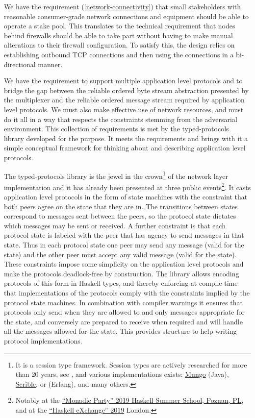 \documentclass[11pt,a4paper]{article}
\begin{document}
We have the requirement
(\cref{network-connectivity}) that small
stakeholders with reasonable consumer-grade network connections and
equipment should be able to operate a stake pool. This translates to the
technical requirement that nodes behind firewalls should be able to take
part without having to make manual alterations to their firewall
configuration. To satisfy this, the design relies on establishing
outbound TCP connections and then using the connections in a
bi-directional manner.

We have the requirement to support multiple application level protocols
and to bridge the gap between the reliable ordered byte stream
abstraction presented by the multiplexer and the reliable ordered
message stream required by application level protocols. We must also
make effective use of network resources, and must do it all in a way
that respects the constraints stemming from the adversarial environment.
This collection of requirements is met by the typed-protocols library
developed for the purpose. It meets the requirements and brings with it
a simple conceptual framework for thinking about and describing
application level protocols.

The typed-protocols library is the jewel in the crown\footnote{It is a
  session type framework. Session types are actively researched for more
  than 20 years, see \cite{H93, THK94, HVK98}, and various
  implementations exists:
  \href{http://www.dcs.gla.ac.uk/research/mungo/}{{Mungo}} (Java),
  \href{http://www.scrible.org}{{Scrible}}, or \cite{MV11} (Erlang), and
  many others.} of the network layer implementation and it has already
been presented at three public events\footnote{Notably at the
  \href{https://monadic.party/\#talks}{``Monadic Party'' 2019 Haskell
  Summer School, Poznan, PL}, and at the
  \href{https://skillsmatter.com/conferences/11741-haskell-exchange-2019\#program}{{``Haskell
  eXchange'' 2019}} London.}. It casts application level protocols in
the form of state machines with the constraint that both peers agree on
the state that they are in. The transitions between states correspond to
messages sent between the peers, so the protocol state dictates which
messages may be sent or received. A further constraint is that each
protocol state is labeled with the peer that has agency to send messages
in that state. Thus in each protocol state one peer may send any message
(valid for the state) and the other peer must accept any valid message
(valid for the state). These constraints impose some simplicity on the
application level protocols and make the protocols deadlock-free by
construction. The library allows encoding protocols of this form in
Haskell types, and thereby enforcing at compile time that
implementations of the protocols comply with the constraints implied by
the protocol state machines. In combination with compiler warnings it
ensures that protocols only send when they are allowed to and only
messages appropriate for the state, and conversely are prepared to
receive when required and will handle all the messages allowed for the
state. This provides structure to help writing protocol implementations.
\end{document}
